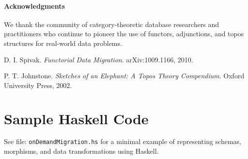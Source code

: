 \documentclass[11pt]{article}
\begin{document}
\paragraph{Acknowledgments}
We thank the community of category-theoretic database researchers and practitioners who continue to pioneer the use of functors, adjunctions, and topos structures for real-world data problems.


\begin{thebibliography}{9}

 D. I. Spivak. 
\emph{Functorial Data Migration}. arXiv:1009.1166, 2010.

 P. T. Johnstone. 
\emph{Sketches of an Elephant: A Topos Theory Compendium}. Oxford University Press, 2002.

\end{thebibliography}

\appendix
\section{Sample Haskell Code}
\label{sec:haskell_code}

See file: \texttt{onDemandMigration.hs} for a minimal example of representing schemas, morphisms, and data transformations using Haskell.
\end{document}
